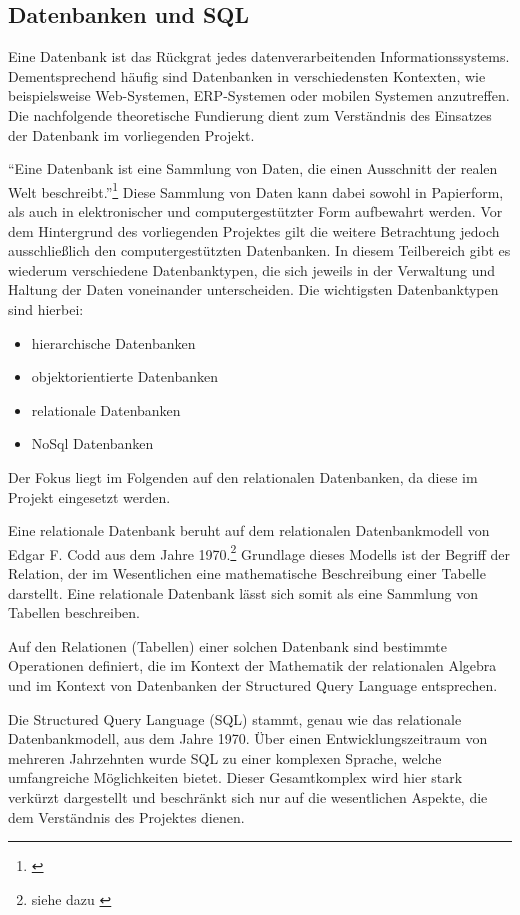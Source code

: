 \subsection{Datenbanken und SQL}
\label{sec:DatenbankenUndSql}

Eine Datenbank ist das Rückgrat jedes datenverarbeitenden Informationssystems.
Dementsprechend häufig sind Datenbanken in verschiedensten Kontexten, wie
beispielsweise Web-Systemen, ERP-Systemen oder mobilen Systemen anzutreffen.
Die nachfolgende theoretische Fundierung dient zum Verständnis des Einsatzes der
Datenbank im vorliegenden Projekt.

"`Eine Datenbank ist eine Sammlung von Daten, die einen Ausschnitt der realen
Welt beschreibt."'\footnote{\citet[S.~18]{elmasri2009}} Diese Sammlung von Daten
kann dabei sowohl in Papierform, als auch in elektronischer und
computergestützter Form aufbewahrt werden. Vor dem Hintergrund des vorliegenden
Projektes gilt die weitere Betrachtung jedoch ausschließlich den
computergestützten Datenbanken. In diesem Teilbereich gibt es wiederum
verschiedene Datenbanktypen, die sich jeweils in der Verwaltung und Haltung der
Daten voneinander unterscheiden. Die wichtigsten Datenbanktypen sind hierbei:

\begin{itemize}
  \item hierarchische Datenbanken
  \item objektorientierte Datenbanken
  \item relationale Datenbanken
  \item NoSql Datenbanken
\end{itemize}

Der Fokus liegt im Folgenden auf den relationalen Datenbanken, da diese im
Projekt eingesetzt werden.

Eine relationale Datenbank beruht auf dem relationalen Datenbankmodell von
Edgar F. Codd aus dem Jahre 1970.\footnote{siehe dazu \citet{codd1970}}
Grundlage dieses Modells ist der Begriff der Relation, der im Wesentlichen eine
mathematische Beschreibung einer Tabelle darstellt. Eine relationale Datenbank
lässt sich somit als eine Sammlung von Tabellen beschreiben.

Auf den Relationen (Tabellen) einer solchen Datenbank sind bestimmte
Operationen definiert, die im Kontext der Mathematik der relationalen Algebra
und im Kontext von Datenbanken der Structured Query Language entsprechen.

Die Structured Query Language (SQL) stammt, genau wie das relationale
Datenbankmodell, aus dem Jahre 1970. Über einen Entwicklungszeitraum von
mehreren Jahrzehnten wurde SQL zu einer komplexen Sprache, welche umfangreiche
Möglichkeiten bietet. Dieser Gesamtkomplex wird hier stark verkürzt dargestellt
und beschränkt sich nur auf die wesentlichen Aspekte, die dem Verständnis des
Projektes dienen.


